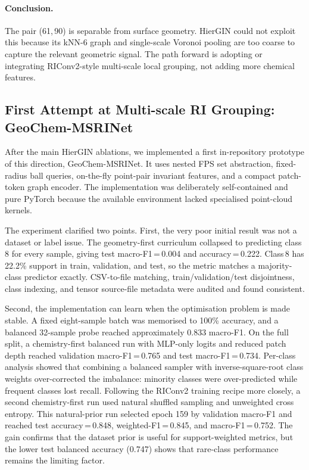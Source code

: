 \paragraph{Conclusion.}
The pair (61,\,90) is separable from surface geometry.
HierGIN could not exploit this because its kNN-6 graph and single-scale Voronoi
pooling are too coarse to capture the relevant geometric signal.
The path forward is adopting or integrating RIConv2-style multi-scale local
grouping, not adding more chemical features.

\subsection{First Attempt at Multi-scale RI Grouping: GeoChem-MSRINet}
\label{sec:analysis:geochem}

After the main HierGIN ablations, we implemented a first in-repository
prototype of this direction, GeoChem-MSRINet.
It uses nested FPS set abstraction, fixed-radius ball queries, on-the-fly
point-pair invariant features, and a compact patch-token graph encoder.
The implementation was deliberately self-contained and pure PyTorch because
the available environment lacked specialised point-cloud kernels.

The experiment clarified two points.
First, the very poor initial result was not a dataset or label issue.
The geometry-first curriculum collapsed to predicting class\,8 for every
sample, giving test macro-F1\,=\,0.004 and accuracy\,=\,0.222.
Class\,8 has 22.2\% support in train, validation, and test, so the metric
matches a majority-class predictor exactly.
CSV-to-file matching, train/validation/test disjointness, class indexing, and
tensor source-file metadata were audited and found consistent.

Second, the implementation can learn when the optimisation problem is made
stable.
A fixed eight-sample batch was memorised to 100\% accuracy, and a balanced
32-sample probe reached approximately 0.833 macro-F1.
On the full split, a chemistry-first balanced run with MLP-only logits and
reduced patch depth reached validation macro-F1\,=\,0.765 and test
macro-F1\,=\,0.734.
Per-class analysis showed that combining a balanced sampler with
inverse-square-root class weights over-corrected the imbalance: minority
classes were over-predicted while frequent classes lost recall.
Following the RIConv2 training recipe more closely, a second chemistry-first
run used natural shuffled sampling and unweighted cross entropy.
This natural-prior run selected epoch 159 by validation macro-F1 and reached
test accuracy\,=\,0.848, weighted-F1\,=\,0.845, and macro-F1\,=\,0.752.
The gain confirms that the dataset prior is useful for support-weighted
metrics, but the lower test balanced accuracy (0.747) shows that rare-class
performance remains the limiting factor.

